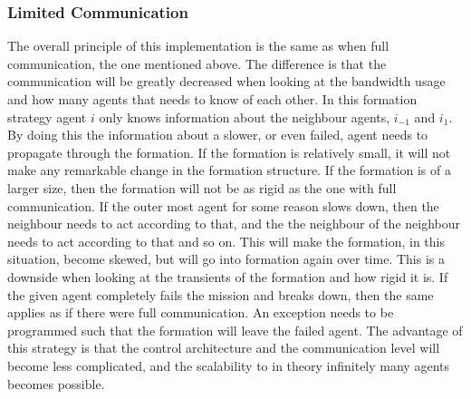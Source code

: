 \subsubsection{Limited Communication}
The overall principle of this implementation is the same as when full communication, the one mentioned above. The difference is that the communication will be greatly decreased when looking at the bandwidth usage and how many agents that needs to know of each other. In this formation strategy agent $i$ only knows information about the neighbour agents, $i_{-1}$ and $i_{1}$. By doing this the information about a slower, or even failed, agent needs to propagate through the formation. If the formation is relatively small, it will not make any remarkable change in the formation structure. If the formation is of a larger size, then the formation will not be as rigid as the one with full communication. If the outer most agent for some reason slows down, then the neighbour needs to act according to that, and the the neighbour of the neighbour needs to act according to that and so on. This will make the formation, in this situation, become skewed, but will go into formation again over time. This is a downside when looking at the transients of the formation and how rigid it is. If the given agent completely fails the mission and breaks down, then the same applies as if there were full communication. An exception needs to be programmed such that the formation will leave the failed agent. The advantage of this strategy is that the control architecture and the communication level will become less complicated, and the scalability to in theory infinitely many agents becomes possible.

